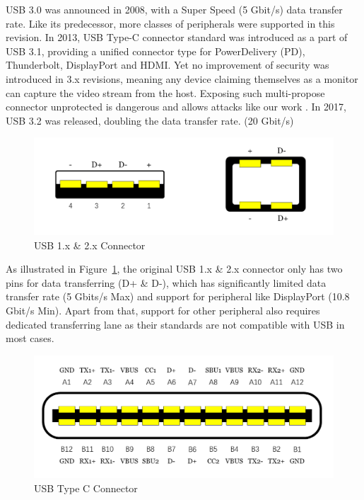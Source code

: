 USB 3.0\cite{usb30} was announced in 2008, with a Super Speed (5 Gbit/s) data transfer rate. Like its predecessor, more classes of peripherals were supported in this revision. In 2013, USB Type-C connector standard was introduced as a part of USB 3.1\cite{usb31}, providing a unified connector type for PowerDelivery (PD), Thunderbolt, DisplayPort and HDMI.  Yet no improvement of security was introduced in 3.x revisions, meaning any device claiming themselves as a monitor can capture the video stream from the host. Exposing such multi-propose connector unprotected is dangerous and allows attacks like our work \tool. In 2017, USB 3.2\cite{usb32} was released, doubling the data transfer rate. (20 Gbit/s)

\begin{figure}[t]
    \centering
	\includegraphics[width=0.7\linewidth]{./Figs/usb_conn.png}
	\caption{USB 1.x \& 2.x Connector}
	\label{fig:usb_conn}
\end{figure}
As illustrated in Figure~\ref{fig:usb_conn}, the original USB 1.x \& 2.x connector only has two pins for data transferring (D+ \& D-), which has significantly limited data transfer rate (5 Gbits/s Max) and support for peripheral like DisplayPort (10.8 Gbit/s Min). Apart from that, support for other peripheral also requires dedicated transferring lane as their standards are not compatible with USB in most cases.
\begin{figure}[t]
	\centering
	\includegraphics[width=\linewidth]{./Figs/usb_c_conn.png}
	\caption{USB Type C Connector}
	\label{fig:usb_c_conn}
\end{figure}

